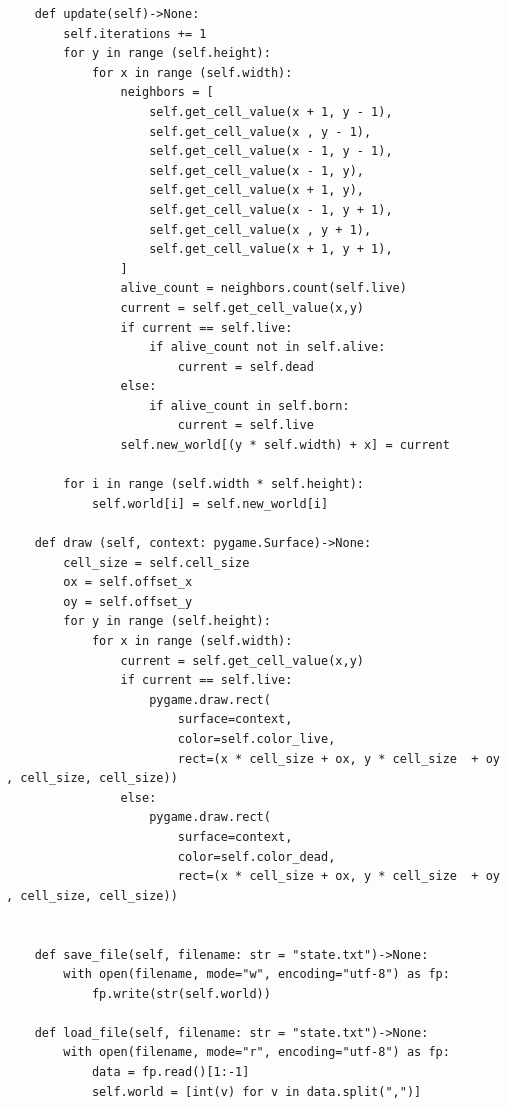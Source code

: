 \documentclass[10pt]{article}
\begin{document}
\begin{lstlisting}
    def update(self)->None:
        self.iterations += 1
        for y in range (self.height):
            for x in range (self.width):
                neighbors = [
                    self.get_cell_value(x + 1, y - 1),
                    self.get_cell_value(x , y - 1),
                    self.get_cell_value(x - 1, y - 1),
                    self.get_cell_value(x - 1, y),
                    self.get_cell_value(x + 1, y),
                    self.get_cell_value(x - 1, y + 1),
                    self.get_cell_value(x , y + 1),
                    self.get_cell_value(x + 1, y + 1),
                ]
                alive_count = neighbors.count(self.live)
                current = self.get_cell_value(x,y)
                if current == self.live:
                    if alive_count not in self.alive:
                        current = self.dead
                else:
                    if alive_count in self.born:
                        current = self.live
                self.new_world[(y * self.width) + x] = current

        for i in range (self.width * self.height):
            self.world[i] = self.new_world[i]

    def draw (self, context: pygame.Surface)->None:
        cell_size = self.cell_size
        ox = self.offset_x
        oy = self.offset_y
        for y in range (self.height):
            for x in range (self.width):
                current = self.get_cell_value(x,y)
                if current == self.live:
                    pygame.draw.rect(
                        surface=context,
                        color=self.color_live, 
                        rect=(x * cell_size + ox, y * cell_size  + oy , cell_size, cell_size))
                else:
                    pygame.draw.rect(
                        surface=context,
                        color=self.color_dead,
                        rect=(x * cell_size + ox, y * cell_size  + oy , cell_size, cell_size))
                        

    def save_file(self, filename: str = "state.txt")->None:
        with open(filename, mode="w", encoding="utf-8") as fp:
            fp.write(str(self.world))

    def load_file(self, filename: str = "state.txt")->None:
        with open(filename, mode="r", encoding="utf-8") as fp:
            data = fp.read()[1:-1]
            self.world = [int(v) for v in data.split(",")]
                \end{lstlisting}
    
    
\end{document}
